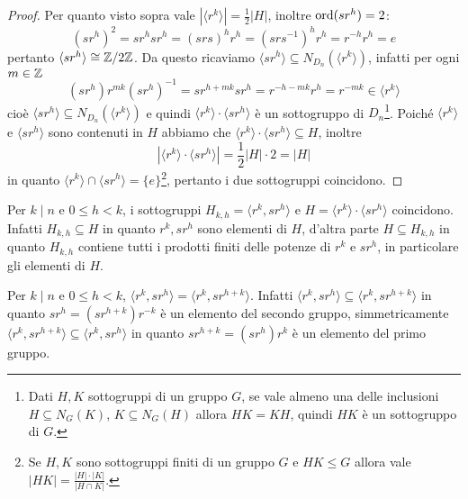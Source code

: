 \documentclass[11pt]{scrartcl}
\begin{document}
\begin{proof}
    Per quanto visto sopra vale $|\langle r^k\rangle| = 
    \displaystyle\frac 1 2|H|$, inoltre $\operatorname{ord}(sr^h) = 2$:
    \[
        (sr^h)^2 = sr^hsr^h = (srs)^hr^h = (srs^{-1})^hr^h = r^{-h}r^h = e
    \]
    pertanto $\langle sr^h\rangle \cong \mathbb{Z}/{2}\mathbb{Z}$. Da questo ricaviamo $\langle sr^h\rangle
    \subseteq N_{D_n}(\langle r^k\rangle)$, infatti per ogni $m \in \mathbb Z$ 
    \[
        (sr^h)r^{mk}(sr^h)^{-1} = sr^{h + mk} sr^h = r^{-h-mk}r^h = r^{-mk}
        \in \langle r^k \rangle
    \]
    cioè $\langle sr^h\rangle \subseteq N_{D_n}(\langle r^k\rangle)$ e quindi
    $\langle r^k\rangle\cdot\langle sr^h\rangle$ è un sottogruppo di $D_n$\footnote
    {Dati $H, K$ sottogruppi
    di un gruppo $G$, se vale almeno una delle inclusioni $H \subseteq N_G(K)$,
    $K \subseteq N_G(H)$ allora $HK = KH$, quindi $HK$ è un sottogruppo di $G$.}.
    Poiché $\langle r^k\rangle$ e $\langle sr^h\rangle$ sono contenuti in $H$
    abbiamo che $\langle r^k\rangle\cdot\langle sr^h\rangle \subseteq H$, inoltre
    \[|\langle r^k\rangle\cdot\langle sr^h\rangle| = \displaystyle\frac 1 2 |H|\cdot 2 = |H|\]
    in quanto $\langle r^k\rangle\cap\langle sr^h\rangle = \{e\}$\footnote{
        Se $H, K$ sono sottogruppi finiti di un gruppo $G$ e $HK\leqslant G$ allora
        vale $|HK| = \displaystyle\frac{|H|\cdot|K|}{|H\cap K|}$.
    }, pertanto 
    i due sottogruppi coincidono.
\end{proof}

\begin{remark}
    Per $k \mid n$ e $0\leq h < k$, i sottogruppi $H_{k, h} = \langle r^k, sr^h\rangle$
    e $H = \langle r^k\rangle\cdot\langle sr^h\rangle$ coincidono. Infatti 
    $H_{k, h}\subseteq H$ in quanto $r^k, sr^h$ sono elementi di $H$, 
    d'altra parte $H \subseteq H_{k, h}$ in quanto $H_{k, h}$ contiene tutti i 
    prodotti finiti delle potenze di $r^k$ e $sr^h$, in particolare gli elementi di $H$.
\end{remark}

\begin{remark}
    Per $k \mid n$ e $0\leq h < k$, $\langle r^k, sr^h\rangle = 
    \langle r^k, sr^{h + k}\rangle$. Infatti $\langle r^k, sr^h\rangle \subseteq
    \langle r^k, sr^{h + k}\rangle$ in quanto $sr^h = (sr^{h + k})r^{-k}$ è
    un elemento del secondo gruppo, simmetricamente $\langle r^k, sr^{h + k}\rangle
    \subseteq \langle r^k, sr^h\rangle$ in quanto $sr^{h + k} = (sr^h)r^k$ è un
    elemento del primo gruppo.
\end{remark}
\end{document}
